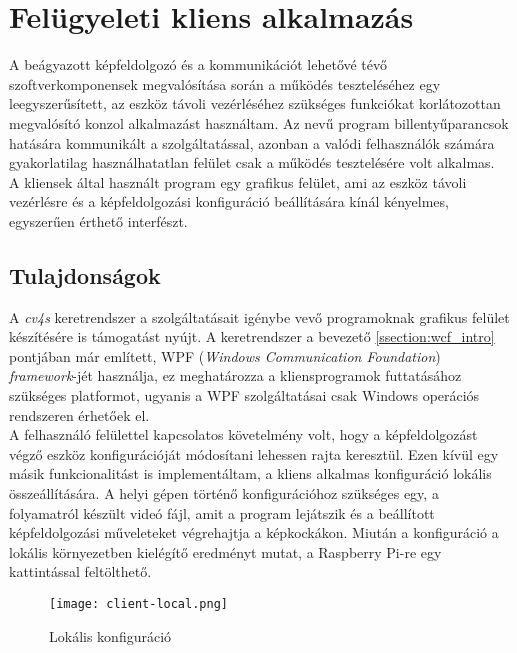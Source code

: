 \chapter{Felügyeleti kliens alkalmazás} \label{chapter:kliens}

A beágyazott képfeldolgozó és a kommunikációt lehetővé tévő szoftverkomponensek megvalósítása során a működés teszteléséhez egy leegyszerűsített, az eszköz távoli vezérléséhez szükséges funkciókat korlátozottan megvalósító konzol alkalmazást használtam. Az  nevű program billentyűparancsok hatására kommunikált a szolgáltatással, azonban a valódi felhasználók számára gyakorlatilag használhatatlan felület csak a működés tesztelésére volt alkalmas.\\
A kliensek által használt program egy grafikus felület, ami az eszköz távoli vezérlésre és a képfeldolgozási konfiguráció beállítására kínál kényelmes, egyszerűen érthető interfészt.

\section{Tulajdonságok}

A \emph{cv4s} keretrendszer a szolgáltatásait igénybe vevő programoknak grafikus felület készítésére is támogatást nyújt. A keretrendszer a bevezető \ref{ssection:wcf_intro} pontjában már említett, WPF (\emph{Windows Communication Foundation}) \emph{framework}-jét használja, ez meghatározza a kliensprogramok futtatásához szükséges platformot, ugyanis a WPF szolgáltatásai csak Windows operációs rendszeren érhetőek el. \\
A felhasználó felülettel kapcsolatos követelmény volt, hogy a képfeldolgozást végző eszköz konfigurációját módosítani lehessen rajta keresztül. Ezen kívül egy másik funkcionalitást is implementáltam, a kliens alkalmas konfiguráció lokális összeállítására. A helyi gépen történő konfigurációhoz szükséges egy, a folyamatról készült videó fájl, amit a program lejátszik és a beállított képfeldolgozási műveleteket végrehajtja a képkockákon. Miután a konfiguráció a lokális környezetben kielégítő eredményt mutat, a Raspberry Pi-re egy kattintással feltölthető.\\

\begin{figure}[h]
\vspace{.5cm}
\texttt{[image: client-local.png]}
\centering
\vspace{.2cm}
\caption{Lokális konfiguráció}
\vspace{.5cm}
\label{fig:client-local}
\end{figure}

